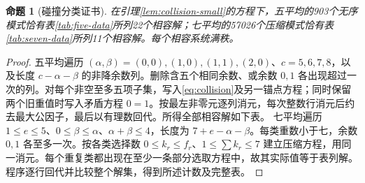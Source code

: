 \documentclass[11pt,a4paper]{article}
\newtheorem{proposition}[theorem]{命题}
\theoremstyle{definition}
\numberwithin{equation}{section}
\begin{document}
\begin{proposition}[碰撞分类证书]\label{prop:collision-certificate}
在引理\ref{lem:collision-small}的方程下，五平均的903个无序模式恰有表\ref{tab:five-data}所列22个相容解；七平均的57026个压缩模式恰有表\ref{tab:seven-data}所列11个相容解。每个相容系统满秩。
\end{proposition}
\begin{proof}
五平均遍历 $(\alpha,\beta)=(0,0),(1,0),(1,1),(2,0)$、$c=5,6,7,8$，以及长度 $c-\alpha-\beta$ 的非降余数列。删除含五个相同余数、或余数 $0,1$ 各出现超过一次的列。对每个非空至多五项子集，写入\eqref{eq:collision}及另一锚点方程；同时保留两个旧重值时写入矛盾方程 $0=1$。按最左非零元逐列消元，每次整数行消元后约去最大公因子，最后以有理数回代。所得全部相容解如下表。
七平均遍历 $1\le e\le5$、$0\le\beta\le\alpha$、$\alpha+\beta\le4$，长度为 $7+e-\alpha-\beta$。每类重数小于七，余数 $0,1$ 各至多一次。按各类选择数 $0\le k_r\le f_r$、$1\le\sum k_r\le7$ 建立压缩方程，用同一消元。每个重复类都出现在至少一条部分选取方程中，故其实际值等于表列解。程序逐行回代并比较整个解集，得到所述计数及完整表。
\end{proof}
\end{document}
